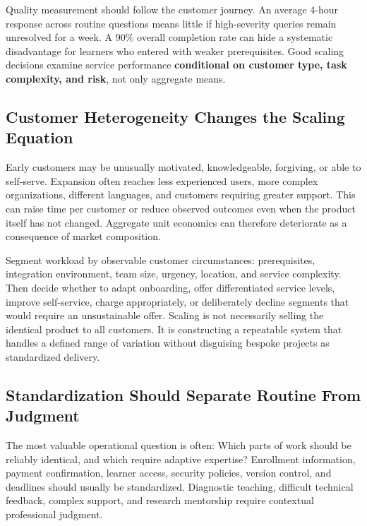 Quality measurement should follow the customer journey. An average 4-hour response across routine questions means little if high-severity queries remain unresolved for a week. A 90\% overall completion rate can hide a systematic disadvantage for learners who entered with weaker prerequisites. Good scaling decisions examine service performance \textbf{conditional on customer type, task complexity, and risk}, not only aggregate means.

\subsection{Customer Heterogeneity Changes the Scaling Equation}
\label{sec:customer_heterogeneity_scaling}

Early customers may be unusually motivated, knowledgeable, forgiving, or able to self-serve. Expansion often reaches less experienced users, more complex organizations, different languages, and customers requiring greater support. This can raise time per customer or reduce observed outcomes even when the product itself has not changed. Aggregate unit economics can therefore deteriorate as a consequence of market composition.

Segment workload by observable customer circumstances: prerequisites, integration environment, team size, urgency, location, and service complexity. Then decide whether to adapt onboarding, offer differentiated service levels, improve self-service, charge appropriately, or deliberately decline segments that would require an unsustainable offer. Scaling is not necessarily selling the identical product to all customers. It is constructing a repeatable system that handles a defined range of variation without disguising bespoke projects as standardized delivery.

\subsection{Standardization Should Separate Routine From Judgment}
\label{sec:standardization_routine_vs_judgment}

The most valuable operational question is often: Which parts of work should be reliably identical, and which require adaptive expertise? Enrollment information, payment confirmation, learner access, security policies, version control, and deadlines should usually be standardized. Diagnostic teaching, difficult technical feedback, complex support, and research mentorship require contextual professional judgment.

